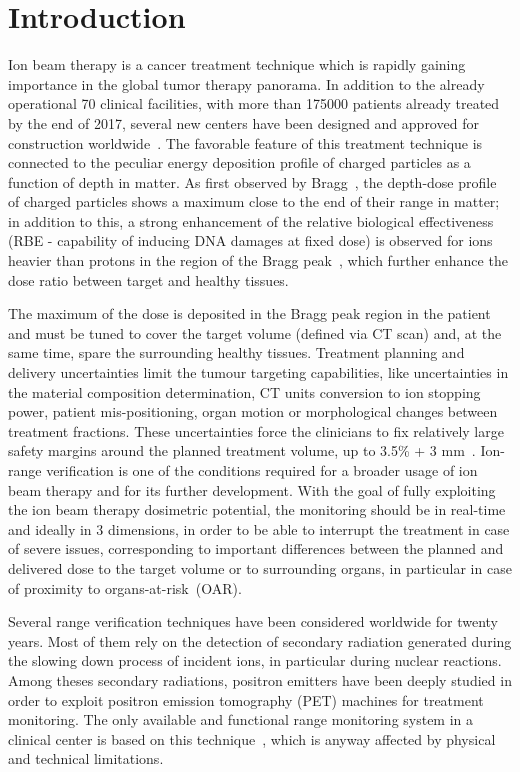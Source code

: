 \section{Introduction}\label{section::Intro}
Ion beam therapy is a cancer treatment technique which is rapidly gaining importance in the global tumor therapy panorama. In addition to the already operational 70 clinical facilities, with more than 175000 patients already treated by the end of 2017, several new centers have been designed and approved for construction worldwide~\cite{PTCOG_stats}. The favorable feature of this treatment technique is connected to the peculiar energy deposition profile of charged particles as a function of depth in matter. As first observed by Bragg~\cite{Bragg_main}, the depth-dose profile of charged particles shows a maximum close to the end of their range in matter; in addition to this, a strong enhancement of the relative biological effectiveness (RBE - capability of inducing DNA damages at fixed dose) is observed for ions heavier than protons in the region of the Bragg peak~\cite{RBE_Elsasser, RBE_Weyrather}, which further enhance the 
dose ratio between target and healthy tissues.

The maximum of the dose is deposited in the Bragg peak region in the patient and must be tuned to cover the target volume (defined via CT scan) and, at the same time, spare the surrounding healthy tissues. Treatment planning and delivery uncertainties limit the tumour targeting capabilities, like uncertainties in the material composition determination, CT units conversion to ion stopping power, patient mis-positioning, organ motion or morphological changes between treatment fractions. These uncertainties force the clinicians to fix relatively large safety margins around the planned treatment volume, up to 3.5\% + 3 mm~\cite{Paganetti:2012aa}. Ion-range verification is one of the conditions required for a broader usage of ion beam therapy and for its further development. With the goal of fully exploiting the ion beam therapy dosimetric potential, the monitoring should be in real-time and ideally in 3 dimensions, in order to be able to interrupt the treatment in case of severe issues, corresponding to important differences between the planned and delivered dose to the target volume or to surrounding organs, in particular in case of proximity to organs-at-risk~(OAR).

Several range verification techniques have been considered worldwide for twenty years. Most of them rely on the detection of secondary radiation generated during the slowing down process of incident ions, in particular during nuclear reactions. Among theses secondary radiations, positron emitters have been deeply studied in order to exploit positron emission tomography (PET) machines for treatment monitoring. The only available and functional range monitoring system in a clinical center is based on this technique~\cite{ENGHARDT2004}, which is anyway affected by physical and technical limitations\cite{PARODI2016}.

